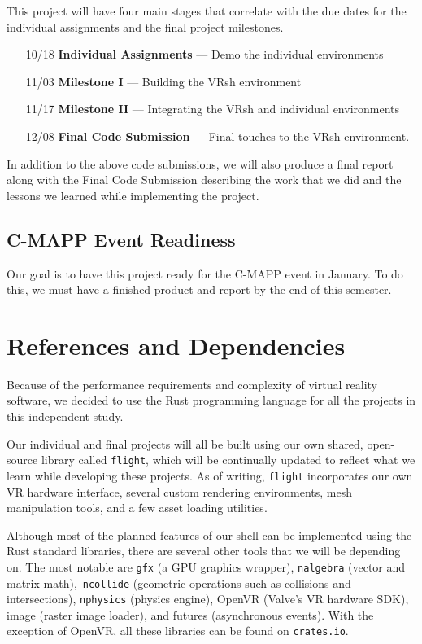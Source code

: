 \documentclass[titlepage,12pt]{article}
\begin{document}
This project will have four main stages that correlate with the due dates for
the individual assignments and the final project milestones.

\begin{enumerate}[leftmargin=*]
    \item [10/18] \textbf{Individual Assignments} --- Demo the individual
        environments
    \item [11/03] \textbf{Milestone I} --- Building the VRsh environment
    \item [11/17] \textbf{Milestone II} --- Integrating the VRsh and individual
        environments
    \item [12/08] \textbf{Final Code Submission} --- Final touches to the VRsh
        environment.
\end{enumerate}

In addition to the above code submissions, we will also produce a final report
along with the Final Code Submission describing the work that we did and the
lessons we learned while implementing the project.

\subsection{C-MAPP Event Readiness}
Our goal is to have this project ready for the C-MAPP event in January. To do
this, we must have a finished product and report by the end of this semester.

\section{References and Dependencies}

Because of the performance requirements and complexity of virtual reality
software, we decided to use the Rust programming language for all the projects
in this independent study.

Our individual and final projects will all be built using our own shared,
open-source library called \texttt{flight}, which will be continually updated to
reflect what we learn while developing these projects. As of writing,
\texttt{flight} incorporates our own VR hardware interface, several custom
rendering environments, mesh manipulation tools, and a few asset loading
utilities.

Although most of the planned features of our shell can be implemented using the
Rust standard libraries, there are several other tools that we will be depending
on.  The most notable are \texttt{gfx} (a GPU graphics wrapper),
\texttt{nalgebra} (vector and matrix math),\ \texttt{ncollide} (geometric
operations such as collisions and intersections), \texttt{nphysics} (physics
engine), OpenVR (Valve's VR hardware SDK), image (raster image loader), and
futures (asynchronous events). With the exception of OpenVR, all these libraries
can be found on \texttt{crates.io}.
\end{document}
